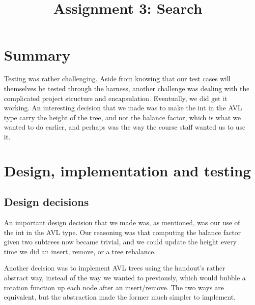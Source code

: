 

\title{Assignment 3: Search}
\author{\name}
\maketitle

\section{Summary}
Testing was rather challenging. Aside from knowing that our test cases will themselves be tested through the harness, another challenge was dealing with the complicated project structure and encapsulation. Eventually, we did get it working. An interesting decision that we made was to make the int in the AVL type carry the height of the tree, and not the balance factor, which is what we wanted to do earlier, and perhaps was the way the course staff wanted us to use it.

\section{Design, implementation and testing}
\subsection{Design decisions}
An important design decision that we made was, as mentioned, was our use of the int in the AVL type. Our reasoning was that computing the balance factor given two subtrees now became trivial, and we could update the height every time we did an insert, remove, or a tree rebalance.

Another decision was to implement AVL trees using the handout's rather abstract way, instead of the way we wanted to previously, which would bubble a rotation function up each node after an insert/remove. The two ways are equivalent, but the abstraction made the former much simpler to implement.

